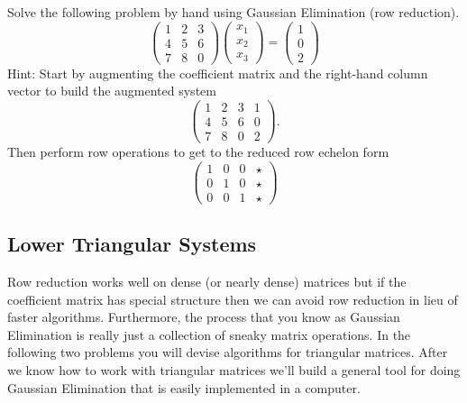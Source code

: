 \begin{problem}
    Solve the following problem by hand using Gaussian Elimination (row reduction).
    \[ \begin{pmatrix} 1 & 2 & 3 \\ 4 & 5 & 6 \\ 7 & 8 & 0 \end{pmatrix} \begin{pmatrix}
            x_1 \\ x_2 \\ x_3 \end{pmatrix} = \begin{pmatrix} 1 \\ 0 \\ 2\end{pmatrix} \]
    Hint: Start by augmenting the coefficient matrix and the right-hand column vector to
    build the augmented system
    \[ \left( \begin{array}{ccc|c} 1 & 2 & 3 & 1 \\ 4 & 5 & 6 & 0 \\ 7 & 8 & 0 & 2
    \end{array} \right). \]
    Then perform row operations to get to the reduced row echelon form
    \[ \left( \begin{array}{ccc|c} 1 & 0 & 0 & \star \\
        0 & 1 & 0 & \star \\
        0 & 0 & 1 & \star \end{array} \right) \]
\end{problem}


\subsection{Lower Triangular Systems}
Row reduction works well on dense (or nearly dense) matrices but if the coefficient matrix
has special structure then we can avoid row reduction in lieu of faster algorithms.
Furthermore, the process that you know as Gaussian Elimination is really just a collection
of sneaky matrix operations.  In the
following two problems you will devise algorithms for triangular matrices.  After we know
how to work with triangular matrices we'll build a general tool for doing Gaussian
Elimination that is easily implemented in a computer.

